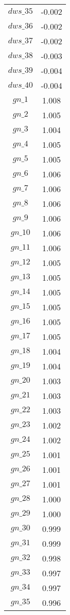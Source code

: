 \begin{center}
\begin{longtable}{cc}
$dws\_35$ 	 & 	 -0.002 \\
$dws\_36$ 	 & 	 -0.002 \\
$dws\_37$ 	 & 	 -0.002 \\
$dws\_38$ 	 & 	 -0.003 \\
$dws\_39$ 	 & 	 -0.004 \\
$dws\_40$ 	 & 	 -0.004 \\
$gn\_1$ 	 & 	 1.008 \\
$gn\_2$ 	 & 	 1.005 \\
$gn\_3$ 	 & 	 1.004 \\
$gn\_4$ 	 & 	 1.005 \\
$gn\_5$ 	 & 	 1.005 \\
$gn\_6$ 	 & 	 1.006 \\
$gn\_7$ 	 & 	 1.006 \\
$gn\_8$ 	 & 	 1.006 \\
$gn\_9$ 	 & 	 1.006 \\
$gn\_10$ 	 & 	 1.006 \\
$gn\_11$ 	 & 	 1.006 \\
$gn\_12$ 	 & 	 1.005 \\
$gn\_13$ 	 & 	 1.005 \\
$gn\_14$ 	 & 	 1.005 \\
$gn\_15$ 	 & 	 1.005 \\
$gn\_16$ 	 & 	 1.005 \\
$gn\_17$ 	 & 	 1.005 \\
$gn\_18$ 	 & 	 1.004 \\
$gn\_19$ 	 & 	 1.004 \\
$gn\_20$ 	 & 	 1.003 \\
$gn\_21$ 	 & 	 1.003 \\
$gn\_22$ 	 & 	 1.003 \\
$gn\_23$ 	 & 	 1.002 \\
$gn\_24$ 	 & 	 1.002 \\
$gn\_25$ 	 & 	 1.001 \\
$gn\_26$ 	 & 	 1.001 \\
$gn\_27$ 	 & 	 1.001 \\
$gn\_28$ 	 & 	 1.000 \\
$gn\_29$ 	 & 	 1.000 \\
$gn\_30$ 	 & 	 0.999 \\
$gn\_31$ 	 & 	 0.999 \\
$gn\_32$ 	 & 	 0.998 \\
$gn\_33$ 	 & 	 0.997 \\
$gn\_34$ 	 & 	 0.997 \\
$gn\_35$ 	 & 	 0.996 \\

\end{longtable}
\end{center}
